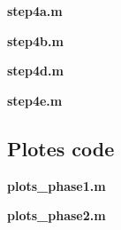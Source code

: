 \textbf{step4a.m}



\textbf{step4b.m}



\textbf{step4d.m}



\textbf{step4e.m}



\subsection{Plotes code}

\textbf{plots\_phase1.m}



\textbf{plots\_phase2.m}



